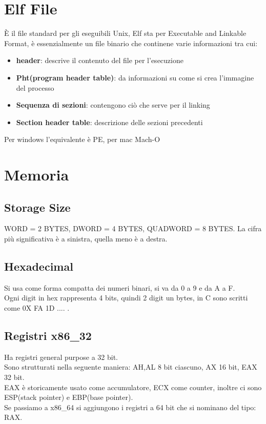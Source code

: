 \documentclass[oneside,a4paper,11pt]{book}
\theoremstyle{italicstyle}
\theoremstyle{normStyle}
\begin{document}
\section{Elf File}
È il file standard per gli eseguibili Unix, Elf sta per Executable and Linkable Format, è essenzialmente un file binario che continene varie informazioni tra cui:
\begin{itemize}
	\item \textbf{header}: descrive il contenuto del file per l'esecuzione
	\item \textbf{Pht(program header table)}: da informazioni su come si crea l'immagine del processo
	\item \textbf{Sequenza di sezioni}: contengono ciò che serve per il linking
	\item \textbf{Section header table}: descrizione delle sezioni precedenti 
\end{itemize}
Per windows l'equivalente è PE, per mac Mach-O
\section{Memoria}
\subsection{Storage Size}
WORD = 2 BYTES, DWORD = 4 BYTES, QUADWORD = 8 BYTES.
La cifra più significativa è a sinistra, quella meno è a destra.
\subsection{Hexadecimal}
Si usa come forma compatta dei numeri binari, si va da 0 a 9 e da A a F.\\
Ogni digit in hex rappresenta 4 bits, quindi 2 digit un bytes, in C sono scritti come 0X FA 1D .... .
\subsection{Registri x86\_32}
Ha registri general purpose a 32 bit.\\
Sono strutturati nella seguente maniera: AH,AL 8 bit ciascuno, AX 16 bit, EAX 32 bit.\\
EAX è storicamente usato come accumulatore, ECX come counter, inoltre ci sono ESP(stack pointer) e EBP(base pointer).\\
Se passiamo a x86\_64 si aggiungono i registri a 64 bit che si nominano del tipo: RAX.
\end{document}

